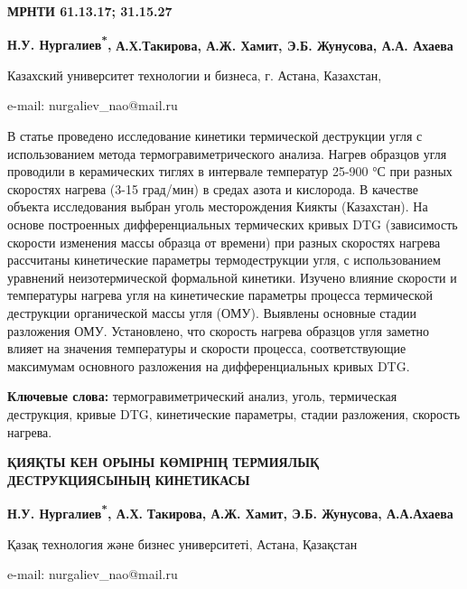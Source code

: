 \clearpage
{\bfseries МРНТИ 61.13.17; 31.15.27}


\begin{center}
{\bfseries Н.У. Нургалиев\textsuperscript{*},} {\bfseries А.Х.Такирова, А.Ж.
Хамит, Э.Б. Жунусова, А.А. Ахаева}

Казахский университет технологии и бизнеса, г. Астана, Казахстан,

e-mail: nurgaliev\_nao@mail.ru
\end{center}

\hspace{1.5em} В статье проведено исследование кинетики термической деструкции угля с
использованием метода термогравиметрического анализа. Нагрев образцов
угля проводили в керамических тиглях в интервале температур 25-900 °С
при разных скоростях нагрева (3-15 град/мин) в средах азота и кислорода.
В качестве объекта исследования выбран уголь месторождения Киякты
(Казахстан). На основе построенных дифференциальных термических кривых
DTG (зависимость скорости изменения массы образца от времени) при разных
скоростях нагрева рассчитаны кинетические параметры термодеструкции
угля, с использованием уравнений неизотермической формальной кинетики.
Изучено влияние скорости и температуры нагрева угля на кинетические
параметры процесса термической деструкции органической массы угля (ОМУ).
Выявлены основные стадии разложения ОМУ. Установлено, что скорость
нагрева образцов угля заметно влияет на значения температуры и скорости
процесса, соответствующие максимумам основного разложения на
дифференциальных кривых DTG.

\hspace{1.5em} {\bfseries Ключевые слова:} термогравиметрический анализ, уголь,
термическая деструкция, кривые DTG, кинетические параметры, стадии
разложения, скорость нагрева.

\begin{center}
{\large\bfseries ҚИЯҚТЫ КЕН ОРЫНЫ КӨМІРНІҢ ТЕРМИЯЛЫҚ ДЕСТРУКЦИЯСЫНЫҢ КИНЕТИКАСЫ}

\vspace{1em}
{\bfseries Н.У. Нургалиев\textsuperscript{*}, А.Х.} {\bfseries Такирова, А.Ж.
Хамит, Э.Б. Жунусова, А.А.Ахаева}

Қазақ технология және бизнес университеті, Астана, Қазақстан

e-mail: nurgaliev\_nao@mail.ru
\end{center}

